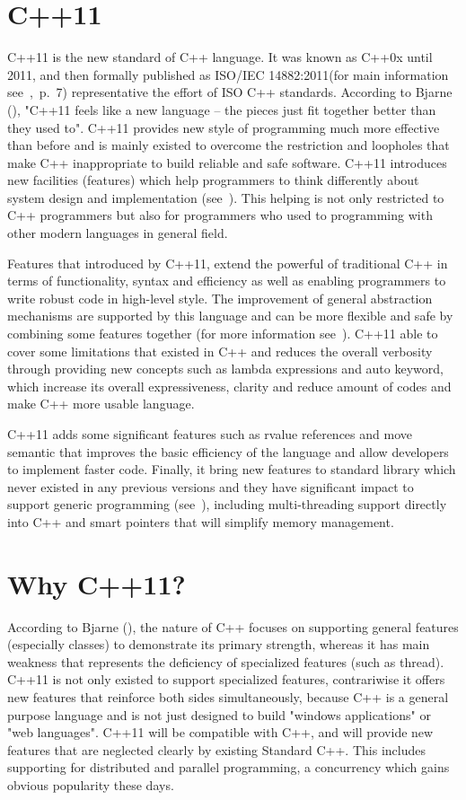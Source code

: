 \documentclass[11pt]{report}
\begin{document}
\section{C++11}
\label{sec: C++11}
C++11 is the new standard of C++ language. It was known as C++0x until 2011, and then formally published as ISO/IEC 14882:2011(for main information see~\cite{Josuttis:2012:CppStandard},~p.~7) representative the effort of ISO C++ standards.  According to Bjarne (\cite{Stroustrup:2012:Cpp11}), "C++11 feels like a new language -- the pieces just fit together better than they used to". C++11 provides new style of programming much more effective than before and is mainly existed to overcome the restriction and loopholes that make C++ inappropriate to build reliable and safe software.  C++11 introduces new facilities (features) which help programmers to think differently about system design and implementation (see~\cite{Stroustrup:2012:Cpp11}). This helping is not only restricted to C++ programmers but also for programmers who used to programming with other modern languages in general field. 

Features that introduced by C++11, extend the powerful of traditional C++ in terms of functionality, syntax and efficiency as well as enabling programmers to write robust code in high-level style. The improvement of general abstraction mechanisms are supported by this language and can be more flexible and safe by combining some features together (for more information see~\cite{Stroustrup:2012:Cpp11}). C++11 able to cover some limitations that existed in C++ and reduces the overall verbosity through providing new concepts such as lambda expressions and auto keyword, which increase its overall expressiveness, clarity and  reduce amount of codes and make C++ more usable language.

C++11 adds some significant features such as rvalue references and move semantic that improves the basic efficiency of the language and allow developers to implement faster code. Finally, it bring new features to standard library which never existed in any previous versions and they have significant impact to support generic programming (see~\cite{Stroustrup:2012:Cpp11}), including multi-threading support directly into C++ and smart pointers that will simplify memory management.

\section{Why C++11?}
\label{sec: why C++11}
According to Bjarne (\cite{Stroustrup:2005:Cpp}), the nature of C++ focuses on supporting general features (especially classes) to demonstrate its primary strength, whereas it has main weakness that represents the deficiency of specialized features (such as thread). C++11 is not  only existed to support specialized features, contrariwise it offers new features that reinforce both sides simultaneously, because C++ is a general purpose language and is not just designed to build "windows applications" or "web languages". C++11 will be compatible with C++, and will provide new features that are neglected clearly by existing Standard C++. This includes supporting for distributed and parallel programming, a concurrency which gains obvious popularity these days.
\end{document}
